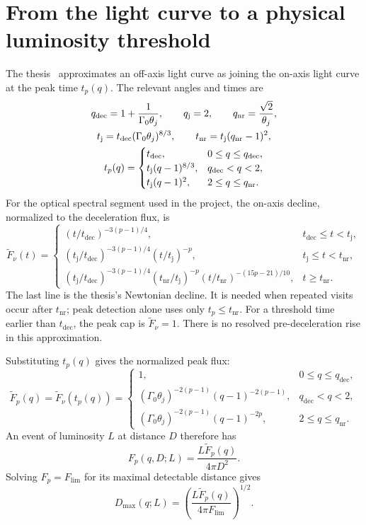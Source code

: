 \documentclass[11pt,a4paper]{article}
\newcommand{\dec}{\mathrm{dec}}
\newcommand{\nr}{\mathrm{nr}}
\newcommand{\Flim}{F_{\mathrm{lim}}}
\newcommand{\tdec}{t_{\mathrm{dec}}}
\newcommand{\tj}{t_{\mathrm j}}
\newcommand{\tnr}{t_{\mathrm{nr}}}
\newcommand{\ft}{\widetilde F_\nu}
\newcommand{\fp}{\widetilde F_p}
\begin{document}
\section{From the light curve to a physical luminosity threshold}
\label{sec:threshold}
The thesis~\cite{Thesis} approximates an off-axis light curve as joining the on-axis
light curve at the peak time $t_p(q)$. The relevant angles and times are
\begin{gather}
 q_\dec=1+\frac1{\Gamma_0\theta_j},\qquad
 q_{\rm j}=2,\qquad q_\nr=\frac{\sqrt2}{\theta_j},
 \label{eq:angles}\\
 \tj=\tdec(\Gamma_0\theta_j)^{8/3},\qquad
 \tnr=\tj(q_\nr-1)^2,
 \label{eq:times}\\
 t_p(q)=\begin{cases}
 \tdec,&0\le q\le q_\dec,\\
 \tj(q-1)^{8/3},&q_\dec<q<2,\\
 \tj(q-1)^2,&2\le q\le q_\nr.
 \end{cases}
 \label{eq:peak-time}
\end{gather}
For the optical spectral segment used in the project, the on-axis decline,
normalized to the deceleration flux, is
\begin{equation}
 \ft(t)=\begin{cases}
 (t/\tdec)^{-3(p-1)/4},&\tdec\le t<\tj,\\[2pt]
 (\tj/\tdec)^{-3(p-1)/4}(t/\tj)^{-p},&\tj\le t<\tnr,\\[2pt]
 (\tj/\tdec)^{-3(p-1)/4}(\tnr/\tj)^{-p}
 (t/\tnr)^{-(15p-21)/10},&t\ge\tnr.
 \end{cases}
 \label{eq:lightcurve}
\end{equation}
The last line is the thesis's Newtonian decline. It is needed when repeated
visits occur after $\tnr$; peak detection alone uses only $t_p\le\tnr$.
For a threshold time earlier than $\tdec$, the peak cap is $\ft=1$.
There is no resolved pre-deceleration rise in this approximation.

Substituting $t_p(q)$ gives the normalized peak flux:
\begin{equation}
 \fp(q)=\ft(t_p(q))=\begin{cases}
 1,&0\le q\le q_\dec,\\[2pt]
 (\Gamma_0\theta_j)^{-2(p-1)}(q-1)^{-2(p-1)},&q_\dec<q<2,\\[2pt]
 (\Gamma_0\theta_j)^{-2(p-1)}(q-1)^{-2p},&2\le q\le q_\nr.
 \end{cases}
 \label{eq:peak-flux}
\end{equation}
An event of luminosity $L$ at distance $D$ therefore has
\begin{equation}
 F_p(q,D;L)=\frac{L\fp(q)}{4\pi D^2}.
 \label{eq:observed-flux}
\end{equation}
Solving $F_p=\Flim$ for its maximal detectable distance gives
\begin{equation}
 D_{\max}(q;L)=\left(\frac{L\fp(q)}{4\pi\Flim}\right)^{1/2}.
 \label{eq:Dmax}
\end{equation}
\end{document}
